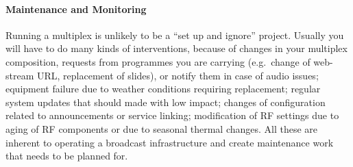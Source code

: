 \paragraph{Maintenance and Monitoring}
Running a multiplex is unlikely to be a ``set up and ignore'' project. Usually
you will have to do many kinds of interventions, because of changes in your
multiplex composition, requests from programmes you are carrying (e.g.~change of
web-stream URL, replacement of slides), or notify them in case of audio issues;
equipment failure due to weather conditions requiring replacement; regular
system updates that should made with low impact; changes of configuration
related to announcements or service linking; modification of RF settings due to
aging of RF components or due to seasonal thermal changes. All these are
inherent to operating a broadcast infrastructure and create maintenance work
that needs to be planned for.

